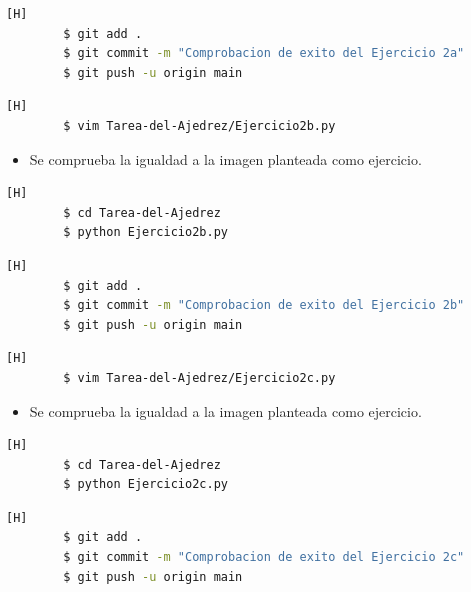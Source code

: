 \documentclass{article}
\begin{document}
	\begin{lstlisting}[language=bash,caption={Commit: Comprobacion de exito del Ejercicio 2a}][H]
		$ git add .
		$ git commit -m "Comprobacion de exito del Ejercicio 2a"			
		$ git push -u origin main
	\end{lstlisting}

\begin{lstlisting}[language=bash,caption={Creando Ejercicio2b.py}][H]
		$ vim Tarea-del-Ajedrez/Ejercicio2b.py
	\end{lstlisting}
	
	
\begin{itemize}
    \item  Se comprueba la igualdad a la imagen planteada como ejercicio.
\end{itemize}

	\begin{lstlisting}[language=bash,caption={Probando código}][H]
		$ cd Tarea-del-Ajedrez
		$ python Ejercicio2b.py
	\end{lstlisting}
	\begin{lstlisting}[language=bash,caption={Commit: Comprobacion de exito del Ejercicio 2b}][H]
		$ git add .
		$ git commit -m "Comprobacion de exito del Ejercicio 2b"			
		$ git push -u origin main
	\end{lstlisting}
 
		 \begin{lstlisting}[language=bash,caption={Creando Ejercicio2c.py}][H]
		$ vim Tarea-del-Ajedrez/Ejercicio2c.py
	\end{lstlisting}
	
	
\begin{itemize}
    \item  Se comprueba la igualdad a la imagen planteada como ejercicio.
\end{itemize}

	\begin{lstlisting}[language=bash,caption={Probando código}][H]
		$ cd Tarea-del-Ajedrez
		$ python Ejercicio2c.py
	\end{lstlisting}
	\begin{lstlisting}[language=bash,caption={Commit: Comprobacion de exito del Ejercicio 2c}][H]
		$ git add .
		$ git commit -m "Comprobacion de exito del Ejercicio 2c"			
		$ git push -u origin main
	\end{lstlisting}
\end{document}
